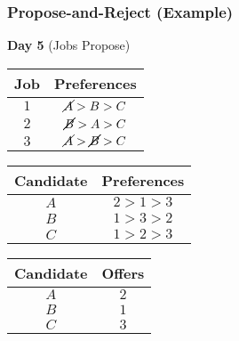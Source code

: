 \documentclass{beamer}
\begin{document}
\begin{frame}
    \frametitle{Propose-and-Reject (Example)}
    {\bf Day 5} (Jobs Propose)
    \begin{center}
        \begin{tabular}{c|c}
            Job & Preferences \\
            \hline
            $1$ & $\cancel{A}>B>C$\\
            $2$ & $\cancel{B}>A>C$\\
            $3$ & $\cancel{A}>\cancel{B}>C$
        \end{tabular}
        \hspace{10pt}
        \begin{tabular}{c|c}
            Candidate & Preferences \\
            \hline
            $A$ & $2>1>3$\\
            $B$ & $1>3>2$\\
            $C$ & $1>2>3$
        \end{tabular}
    \end{center}
    \begin{center}
        \begin{tabular}{c|c}
            Candidate & Offers \\
            \hline
            $A$ & $2$ \\
            $B$ & $1$ \\
            $C$ & $3$
        \end{tabular}
    \end{center}
\end{frame}
\end{document}
